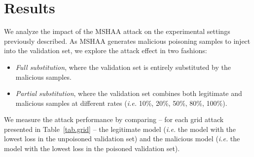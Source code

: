 
\section{Results}
We analyze the impact of the MSHAA attack on the experimental settings previously described.
As MSHAA generates malicious poisoning samples to inject into the validation set, we explore the attack effect in two fashions:
\begin{itemize}
    \item \textit{Full substitution}, where the validation set is entirely substituted by the malicious samples. 
    \item \textit{Partial substitution}, where the validation set combines both legitimate and malicious samples at different rates (\textit{i.e.} 10\%, 20\%, 50\%, 80\%, 100\%). 
\end{itemize}
We measure the attack performance by comparing -- for each grid attack presented in Table~\ref{tab.grid} -- the legitimate model (\textit{i.e.} the model with the lowest loss in the unpoisoned validation set) and the malicious model (\textit{i.e.} the model with the lowest loss in the poisoned validation set). 

